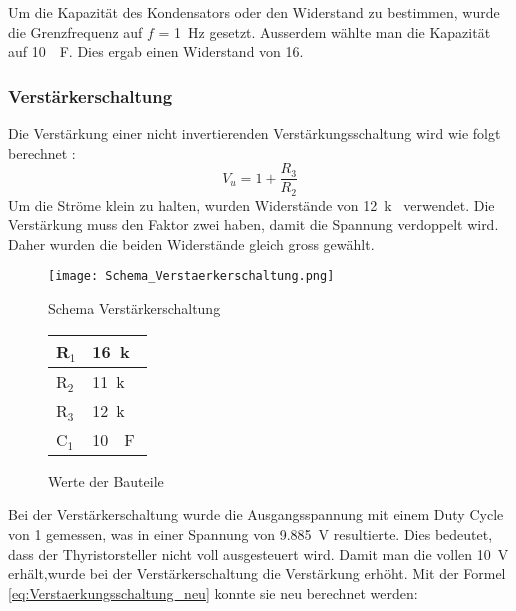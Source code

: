 Um die Kapazität des Kondensators oder den Widerstand zu bestimmen, wurde die Grenzfrequenz auf $f$ = \SI{1}{Hz} gesetzt. Ausserdem wählte man die Kapazität auf \SI{10}{\mu F}. Dies ergab einen Widerstand von \SI{16}{\Omega}. 




\subsubsection*{Verstärkerschaltung}
Die Verstärkung einer nicht invertierenden Verstärkungsschaltung wird wie folgt berechnet \cite{Verstaerker}:
\begin{equation}\label{eq:Verstärkerschaltung}
V_u = 1 + \frac{R_3}{R_2}
\end{equation}
Um die Ströme klein zu halten, wurden Widerstände von \SI{12}{k\Omega} verwendet. Die Verstärkung muss den Faktor zwei haben, damit die Spannung verdoppelt wird. Daher wurden die beiden Widerstände gleich gross gewählt.


\newpage
\begin{figure}[ht!]  
	\centering 
	\begin{minipage}[t]{.76\textwidth} \centering 
		\centering
		\texttt{[image: Schema\_Verstaerkerschaltung.png]}	
		\caption{Schema Verstärkerschaltung}\label{fig:Verstaerkerschaltung}
	\end{minipage}	
	\begin{minipage}[b]{.23\textwidth}
		\centering
		\begin{tabular}{|l|l|}
			\hline
			R$_1$ & \SI{16}{k\Omega} 	\\ 	\hline
			R$_2$ & \SI{11}{k\Omega} 	\\ 	\hline
			R$_3$ & \SI{12}{k\Omega} 	\\	\hline
			C$_1$ & \SI{10}{\mu F} 		\\	\hline
		\end{tabular}
		\caption{Werte der Bauteile}
		\label{tab:Verstaerkerschaltung}
	\end{minipage}
\end{figure} 



Bei der Verstärkerschaltung wurde die Ausgangsspannung mit einem Duty Cycle von 1 gemessen, was in einer Spannung von \SI{9.885}{V} resultierte. Dies bedeutet, dass der Thyristorsteller nicht voll ausgesteuert wird. Damit man die vollen \SI{10}{V} erhält,wurde bei der Verstärkerschaltung die Verstärkung erhöht. Mit der Formel \ref{eq:Verstaerkungsschaltung_neu} konnte sie neu berechnet werden:

